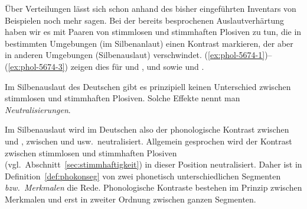 
Über Verteilungen lässt sich schon anhand des bisher eingeführten Inventars von Beispielen noch mehr sagen.
Bei der bereits besprochenen Auslautverhärtung haben wir es mit Paaren von stimmlosen und stimmhaften Plosiven zu tun, die in bestimmten Umgebungen (im Silbenanlaut) einen Kontrast markieren, der aber in anderen Umgebungen (Silbenauslaut) verschwindet.
(\ref{ex:phol-5674-1})--(\ref{ex:phol-5674-3}) zeigen dies für \textipa{[g]} und \textipa{[k]}, \textipa{[d]} und \textipa{[t]} sowie \textipa{[b]} und \textipa{[p]}.

\begin{exe}
  \ex\label{ex:phol-5674-1}
  \begin{xlist}
  \end{xlist}
  \ex\label{ex:phol-5674-2}
  \begin{xlist}
  \end{xlist}
  \ex\label{ex:phol-5674-3}
  \begin{xlist}
  \end{xlist}
\end{exe}

Im Silbenauslaut des Deutschen gibt es prinzipiell keinen Unterschied zwischen stimmlosen und stimmhaften Plosiven.
Solche Effekte nennt man \textit{Neutralisierungen}.


Im Silbenauslaut wird im Deutschen also der phonologische Kontrast zwischen \textipa{[g]} und \textipa{[k]}, zwischen \textipa{[d]} und \textipa{[t]} usw.\ neutralisiert.
Allgemein gesprochen wird der Kontrast zwischen stimmlosen und stimmhaften Plosiven (vgl.\ Abschnitt~\ref{sec:stimmhaftigkeit}) in dieser Position neutralisiert.
Daher ist in Definition~\ref{def:phokonseg} von zwei phonetisch unterschiedlichen Segmenten \textit{bzw.\ Merkmalen} die Rede.
Phonologische Kontraste bestehen im Prinzip zwischen Merkmalen und erst in zweiter Ordnung zwischen ganzen Segmenten.

